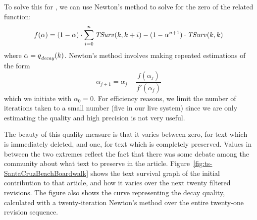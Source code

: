 To solve this for , we can use Newton's method
to solve for the zero of the related function:
\begin{equation*}
  f(\alpha) = (1 - \alpha) \cdot \sum_{i=0}^n \mathit{TSurv}_{}(k,k+i)
        - (1 - \alpha^{n+1}) \cdot \mathit{TSurv}_{}(k,k)
\end{equation*}
where $\alpha = q_\mathit{decay}^{}(k)$.
Newton's method involves making repeated estimations of the form
\begin{equation*}
  \alpha_{j+1} = \alpha_j - \frac{f(\alpha_j)}{f'(\alpha_j)}
\end{equation*}
which we initiate with $\alpha_0 = 0$.
For efficiency reasons, we limit the number of iterations taken
to a small number (five in our live system)
since we are only estimating the quality and high precision
is not very useful.

The beauty of this quality measure is that it varies between
zero, for text which is immediately deleted, and one, for text
which is completely preserved.
Values in between the two extremes reflect the fact that there
was some debate among the community about what text to preserve
in the article.
Figure~\ref{fig:ts-SantaCruzBeachBoardwalk} shows the text survival
graph of the initial contribution to that article, and how it varies
over the next twenty filtered revisions.
The figure also shows the curve representing the decay quality,
calculated with a twenty-iteration Newton's method over the entire
twenty-one revision sequence.


